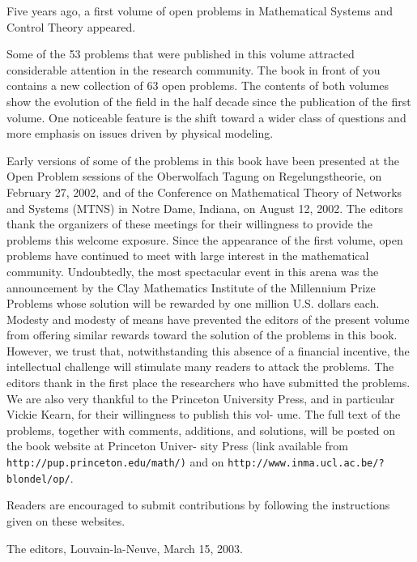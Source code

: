 

\begin{abstracts}

Five years ago, a first volume of open problems in Mathematical Systems
and Control Theory appeared.

Some of the 53 problems that were published
in this volume attracted considerable attention in the research community.
The book in front of you contains a new collection of 63 open problems.
The contents of both volumes show the evolution of the field in the half
decade since the publication of the first volume. One noticeable feature is
the shift toward a wider class of questions and more emphasis on issues
driven by physical modeling.

Early versions of some of the problems in this book have been presented at
the Open Problem sessions of the Oberwolfach Tagung on Regelungstheorie,
on February 27, 2002, and of the Conference on Mathematical Theory of
Networks and Systems (MTNS) in Notre Dame, Indiana, on August 12, 2002.
The editors thank the organizers of these meetings for their willingness to
provide the problems this welcome exposure.
Since the appearance of the first volume, open problems have continued
to meet with large interest in the mathematical community. Undoubtedly,
the most spectacular event in this arena was the announcement by the Clay
Mathematics Institute of the Millennium Prize Problems
whose solution
will be rewarded by one million U.S. dollars each. Modesty and modesty of
means have prevented the editors of the present volume from offering similar
rewards toward the solution of the problems in this book. However, we trust
that, notwithstanding this absence of a financial incentive, the intellectual
challenge will stimulate many readers to attack the problems.
The editors thank in the first place the researchers who have submitted
the problems. We are also very thankful to the Princeton University Press,
and in particular Vickie Kearn, for their willingness to publish this vol-
ume. The full text of the problems, together with comments, additions,
and solutions, will be posted on the book website at Princeton Univer-
sity Press (link available from
\texttt{http://pup.princeton.edu/math/)} and on
\texttt{http://www.inma.ucl.ac.be/?blondel/op/}.

Readers are encouraged to
submit contributions by following the instructions given on these websites.

The editors, Louvain-la-Neuve, March 15, 2003.

\end{abstracts}
